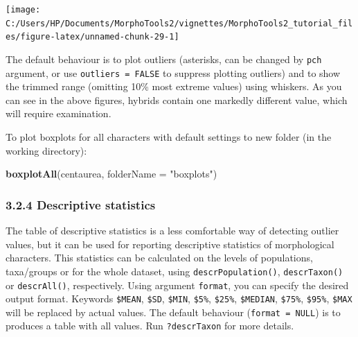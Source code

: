\documentclass[
]{article}
\newenvironment{Shaded}{\begin{snugshade}}{\end{snugshade}}
\newcommand{\DataTypeTok}[1]{\textcolor[rgb]{0.13,0.29,0.53}{#1}}
\newcommand{\KeywordTok}[1]{\textcolor[rgb]{0.13,0.29,0.53}{\textbf{#1}}}
\newcommand{\NormalTok}[1]{#1}
\newcommand{\StringTok}[1]{\textcolor[rgb]{0.31,0.60,0.02}{#1}}
\begin{document}
\begin{center}\texttt{[image: C:/Users/HP/Documents/MorphoTools2/vignettes/MorphoTools2\_tutorial\_files/figure-latex/unnamed-chunk-29-1]} \end{center}

The default behaviour is to plot outliers (asterisks, can be changed by
\texttt{pch} argument, or use \texttt{outliers\ =\ FALSE} to suppress
plotting outliers) and to show the trimmed range (omitting 10\% most
extreme values) using whiskers. As you can see in the above figures,
hybrids contain one markedly different value, which will require
examination.

To plot boxplots for all characters with default settings to new folder
(in the working directory):

\begin{Shaded}
\begin{Highlighting}[]
\KeywordTok{boxplotAll}\NormalTok{(centaurea, }\DataTypeTok{folderName =} \StringTok{"boxplots"}\NormalTok{)}
\end{Highlighting}
\end{Shaded}

\hypertarget{descriptive-statistics}{%
\subsubsection{3.2.4 Descriptive
statistics}\label{descriptive-statistics}}

The table of descriptive statistics is a less comfortable way of
detecting outlier values, but it can be used for reporting descriptive
statistics of morphological characters. This statistics can be
calculated on the levels of populations, taxa/groups or for the whole
dataset, using \texttt{descrPopulation()}, \texttt{descrTaxon()} or
\texttt{descrAll()}, respectively. Using argument \texttt{format}, you
can specify the desired output format. Keywords \texttt{\$MEAN},
\texttt{\$SD}, \texttt{\$MIN}, \texttt{\$5\%}, \texttt{\$25\%},
\texttt{\$MEDIAN}, \texttt{\$75\%}, \texttt{\$95\%}, \texttt{\$MAX} will
be replaced by actual values. The default behaviour
(\texttt{format\ =\ NULL}) is to produces a table with all values. Run
\texttt{?descrTaxon} for more details.
\end{document}
